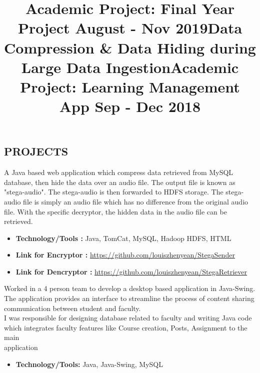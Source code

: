 \documentclass[margin]{res}
\begin{document}
\begin{resume}
\section{PROJECTS}
\location{}
\title{\textbf{Academic Project: Final Year Project \hfill August - Nov 2019}}
\begin{position}
\end{position}
\vspace{-1.2cm}

\location{}
\title{\textbf{Data Compression \& Data Hiding during Large Data Ingestion}}
\begin{position}
A Java based web application which compress data retrieved from MySQL database, then hide the data over an audio file. The output file is known as "stega-audio". The stega-audio is then forwarded to HDFS storage. The stega-audio file is simply an audio file which has no difference from the original audio file. With the specific decryptor, the hidden data in the audio file can be retrieved. \vspace{0.3cm}
\begin{itemize}
    \item \textbf{Technology/Tools :} Java, TomCat, MySQL, Hadoop HDFS, HTML
    \item \textbf{Link for Encryptor :} \url{https://github.com/louiszhenyean/StegaSender}
    \item \textbf{Link for Dencryptor :} \url{https://github.com/louiszhenyean/StegaRetriever}
\end{itemize}
\end{position}

\location{}
\title{\textbf{Academic Project: Learning Management App \hfill Sep - Dec 2018}
 }
\begin{position}
Worked in a 4 person team to develop a desktop based application in Java-Swing. The application provides an interface to streamline the process of content sharing communication between student and faculty.\\
I was responsible for designing database related to faculty and writing Java code which integrates faculty features like Course creation, Posts, Assignment to the main \\application
\begin{itemize}
\item \textbf{Technology/Tools:} Java, Java-Swing, MySQL 
\end{itemize}
\end{position}



\end{resume}
\end{document}

